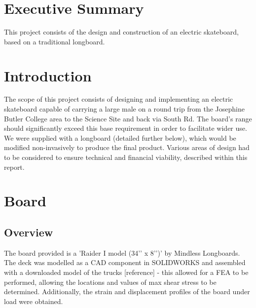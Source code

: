 \documentclass[journal,10pt]{IEEEtran}
\begin{document}
\section{Executive Summary}
        This project consists of the design and construction of an electric skateboard, based on a traditional longboard.
    
\section{Introduction}
        The scope of this project consists of designing and implementing an electric skateboard capable of carrying a large male on a round trip from the Josephine Butler College area to the Science Site and back via South Rd. The board's range should significantly exceed this base requirement in order to facilitate wider use. We were supplied with a longboard (detailed further below), which would be modified non-invasively to produce the final product. Various areas of design had to be considered to ensure technical and financial viability, described within this report.
\section{Board}
    \subsection{Overview}
        The board provided is a 'Raider I model (34’’ x 8’’)’ by Mindless Longboards. The deck was modelled as a CAD component in SOLIDWORKS and assembled with a downloaded model of the trucks [reference] - this allowed for a FEA to be performed, allowing the locations and values of max shear stress to be determined. Additionally, the strain and displacement profiles of the board under load were obtained.
\end{document}
